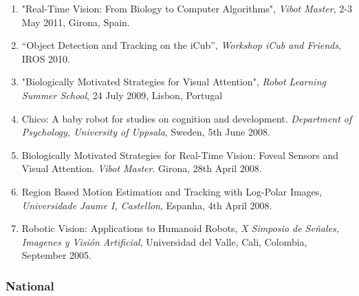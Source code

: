 \begin{enumerate}
{  and Robots}, Birmingham, UK, May 2013.
\item
  "Real-Time Vision: From Biology to Computer Algorithms", \emph{Vibot
  Master}, 2-3 May 2011, Girona, Spain.
\item
  ``Object Detection and Tracking on the iCub'', \emph{Workshop iCub and
  Friends}, IROS 2010.
\item
  "Biologically Motivated Strategies for Visual Attention", \emph{Robot
  Learning Summer School}, 24 July 2009, Lisbon, Portugal
\item
  Chico: A baby robot for studies on cognition and development.
  \emph{Department of Psychology, University of Uppsala}, Sweden, 5th
  June 2008.
\item
  Biologically Motivated Strategies for Real-Time Vision: Foveal Sensors
  and Visual Attention. \emph{Vibot Master}. Girona, 28th April 2008.
\item
  Region Based Motion Estimation and Tracking with Log-Polar Images,
  \emph{Universidade Jaume I, Castellon}, Espanha, 4th April 2008.
\item
  Robotic Vision: Applications to Humanoid Robots, \emph{X Simposio de
  Señales, Imagenes y Visión Artificial}, Universidad del Valle, Cali,
  Colombia, September 2005.
\end{enumerate}

\subsubsection{National}\label{national}

